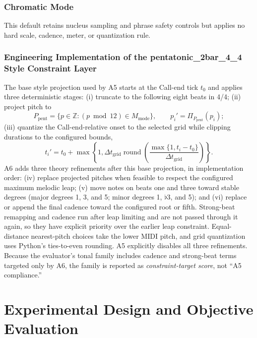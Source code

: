 \documentclass[11pt,a4paper]{article}
\begin{document}
\subsubsection{Chromatic Mode}

This default retains nucleus sampling and phrase safety controls but applies no hard scale, cadence, meter, or quantization rule.

\subsubsection{Engineering Implementation of the pentatonic\_2bar\_4\_4 Style Constraint Layer}

The base style projection used by A5 starts at the Call-end tick $t_0$ and applies three deterministic stages: (i) truncate to the following eight beats in 4/4; (ii) project pitch to
\begin{equation}
P_{\mathrm{pent}}=\{p\in\mathbb Z:(p\bmod 12)\in M_{\mathrm{mode}}\},
\qquad p_i'=\Pi_{P_{\mathrm{pent}}}(p_i);
\end{equation}
(iii) quantize the Call-end-relative onset to the selected grid while clipping durations to the configured bounds,
\begin{equation}
t_i'=t_0+\max\!\left\{1,\Delta t_{\mathrm{grid}}\operatorname{round}\!\left(\frac{\max\{1,t_i-t_0\}}{\Delta t_{\mathrm{grid}}}\right)\right\}.
\end{equation}
A6 adds three theory refinements after this base projection, in implementation order: (iv) replace projected pitches when feasible to respect the configured maximum melodic leap; (v) move notes on beats one and three toward stable degrees (major degrees 1, 3, and 5; minor degrees 1, $\flat3$, and 5); and (vi) replace or append the final cadence toward the configured root or fifth. Strong-beat remapping and cadence run after leap limiting and are not passed through it again, so they have explicit priority over the earlier leap constraint. Equal-distance nearest-pitch choices take the lower MIDI pitch, and grid quantization uses Python's ties-to-even rounding. A5 explicitly disables all three refinements. Because the evaluator's tonal family includes cadence and strong-beat terms targeted only by A6, the family is reported as \emph{constraint-target score}, not ``A5 compliance.''

\section{Experimental Design and Objective Evaluation}
\label{sec:call100-evaluation}
\end{document}
